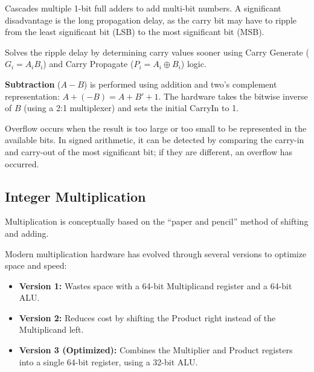 \medskip

\begin{definition}
Cascades multiple 1-bit full adders to add multi-bit numbers. A significant disadvantage is the long propagation delay, as the carry bit may have to ripple from the least significant bit (LSB) to the most significant bit (MSB).
\end{definition}

\medskip

\begin{definition}
Solves the ripple delay by determining carry values sooner using Carry Generate ($G_i = A_i B_i$) and Carry Propagate ($P_i = A_i \oplus B_i$) logic.
\end{definition}

\begin{remark}
\textbf{Subtraction} ($A - B$) is performed using addition and two's complement representation: $A + (-B) = A + B' + 1$. The hardware takes the bitwise inverse of $B$ (using a 2:1 multiplexer) and sets the initial $\text{CarryIn}$ to 1.
\end{remark}

\medskip

\begin{proposition}
Overflow occurs when the result is too large or too small to be represented in the available bits. In signed arithmetic, it can be detected by comparing the carry-in and carry-out of the most significant bit; if they are different, an overflow has occurred.
\end{proposition}

\subsection{Integer Multiplication}

Multiplication is conceptually based on the ``paper and pencil'' method of shifting and adding.

\begin{remark}
Modern multiplication hardware has evolved through several versions to optimize space and speed:

\begin{itemize}
    \item \textbf{Version 1:} Wastes space with a 64-bit Multiplicand register and a 64-bit ALU.
    \item \textbf{Version 2:} Reduces cost by shifting the Product right instead of the Multiplicand left.
    \item \textbf{Version 3 (Optimized):} Combines the Multiplier and Product registers into a single 64-bit register, using a 32-bit ALU.
\end{itemize}

\end{remark}

